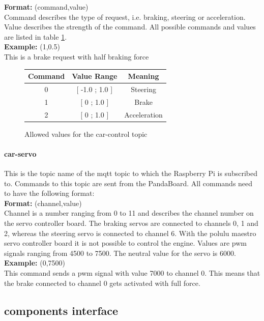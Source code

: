 \textbf{Format:} (command,value) \\
Command describes the type of request, i.e. braking, steering or acceleration. Value describes the strength of the command. All possible commands and values are listed in table \ref{tab:car-control}. \\

\textbf{Example:} (1,0.5) \\
This is a brake request with half braking force \\

\begin{figure}[h]
    \centering
    \begin{tabular}{c | c | c}
        \textbf{Command} & \textbf{Value Range} & \textbf{Meaning} \\ \hline
        0   &   [ -1.0 ; 1.0 ]    & Steering \\
        1   &   [ 0 ; 1.0 ]       & Brake \\ 
        2   &   [ 0 ; 1.0 ]       & Acceleration \\ 
    \end{tabular}
    \caption{Allowed values for the car-control topic}
    \label{tab:car-control}
\end{figure}


\paragraph{car-servo}
This is the topic name of the mqtt topic to which the Raspberry Pi is subscribed to. Commands to this topic are sent from the PandaBoard. All commands need to have the following format: \\ 

\textbf{Format:} (channel,value) \\
Channel is a number ranging from 0 to 11 and describes the channel number on the servo controller board. The braking servos are connected to channels 0, 1 and 2, whereas the steering servo is connected to channel 6. With the polulu maestro servo controller board it is not possible to control the engine. Values are pwm signals ranging from 4500 to 7500. The neutral value for the servo is 6000. \\

\textbf{Example:} (0,7500) \\
This command sends a pwm signal with value 7000 to channel 0. This means that the brake connected to channel 0 gets activated with full force. 

\subsection{components interface}
